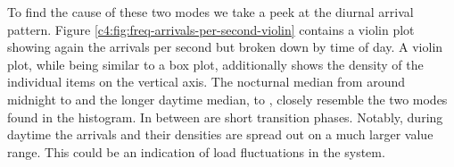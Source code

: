 To find the cause of these two modes we take a peek at the diurnal arrival pattern. Figure \ref{c4:fig:freq-arrivals-per-second-violin} contains a violin plot showing again the arrivals per second but broken down by time of day. A violin plot, while being similar to a box plot, additionally shows the density of the individual items on the vertical axis.
The nocturnal median from around midnight to  and the longer daytime median,  to , closely resemble the two modes found in the histogram. In between are short transition phases. Notably, during daytime the arrivals and their densities are spread out on a much larger value range. This could be an indication of load fluctuations in the system.


\begin{figure}[htbp]
        \centering
{}
\end{figure}
